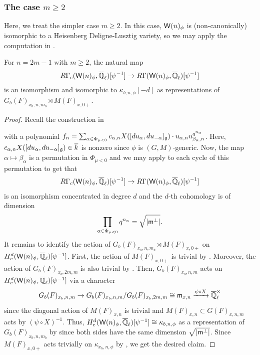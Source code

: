 \documentclass[12pt,reqno]{amsart}
\begin{document}
\subsubsection{The case $m \geq 2$}

Here, we treat the simpler case $m \geq 2$. In this case, ${\mathsf{W}}(n)_\phi$ is (non-canonically) isomorphic to a Heisenberg Deligne-Lusztig variety, so we may apply the computation in \cite{Tak26_Yu}. 

\begin{prop} \label{prop:cohomology_reduction_odd_partial}
    For $n = 2m - 1$ with $m \geq 2$, the natural map 
    \[
        R\Gamma_c({\mathsf{W}}(n)_\phi, {\overline{\mathbb{Q}}_\ell})[\psi^{-1}] \to R\Gamma({\mathsf{W}}(n)_\phi, {\overline{\mathbb{Q}}_\ell})[\psi^{-1}]
    \]
    is an isomorphism and isomorphic to $\kappa_{b, n, \phi}[-d]$ as representations of $G_b(F)_{x_b, n, m_b} \rtimes M(F)_{x, 0+}$. 
\end{prop}
\begin{proof}
    Recall the construction in 
    \begin{center}
    \end{center}
    with a polynomial $f_{n} = \sum_{\alpha \in \Phi_{\mu<0}} c_{\alpha,n}X([du_\alpha, du_{-\alpha}]_{{\mathfrak{g}}}) \cdot u_{\alpha,n} u_{\beta_\alpha,n}^{q^{n_\alpha}}$. Here, $c_{\alpha,n}X([du_\alpha, du_{-\alpha}]_{{\mathfrak{g}}}) \in {\overline{k}}$ is nonzero since $\phi$ is $(G, M)$-generic. Now, the map $\alpha \mapsto \beta_\alpha$ is a permutation in $\Phi_{\mu < 0}$ and we may apply \cite[Theorem 4.1]{Tak26_Yu} to each cycle of this permutation to get that 
    \[
        R\Gamma_c({\mathsf{W}}(n)_\phi, {\overline{\mathbb{Q}}_\ell})[\psi^{-1}] \to R\Gamma({\mathsf{W}}(n)_\phi, {\overline{\mathbb{Q}}_\ell})[\psi^{-1}]
    \]
    is an isomorphism concentrated in degree $d$ and the $d$-th cohomology is of dimension 
    \[
        \prod_{\alpha \in \Phi_{\mu < 0}} q^{n_\alpha} = \sqrt{\lvert {\mathsf{m}}^\perp \rvert}. 
    \]
    It remains to identify the action of $G_b(F)_{x_b, n, m_b} \rtimes M(F)_{x, 0+}$ on $H_c^d({\mathsf{W}}(n)_\phi, {\overline{\mathbb{Q}}_\ell})[\psi^{-1}]$. First, the action of $M(F)_{x, 0+}$ is trivial by . Moreover, the action of $G_b(F)_{x_b, 2m, m}$ is also trivial by . Then, $G_b(F)_{x_b, n, m}$ acts on $H_c^d({\mathsf{W}}(n)_\phi, {\overline{\mathbb{Q}}_\ell})[\psi^{-1}]$ via a character 
    \[
        G_b(F)_{x_b, n, m} \to G_b(F)_{x_b, n, m} / G_b(F)_{x_b, 2m, m} \cong {\mathsf{m}}_{x, n} \xrightarrow{\psi \circ X} {\overline{\mathbb{Q}}_\ell^\times}
    \]
    since the diagonal action of $M(F)_{x, n}$ is trivial and $M(F)_{x, n} \subset G(F)_{x, n, m}$ acts by $(\psi \circ X)^{-1}$. Thus, $H_c^d({\mathsf{W}}(n)_\phi, {\overline{\mathbb{Q}}_\ell})[\psi^{-1}] \cong \kappa_{b, n, \phi}$ as a representation of $G_b(F)_{x_b, n, m_b}$ by  since both sides have the same dimension $\sqrt{\lvert {\mathsf{m}}^\perp \rvert}$. Since $M(F)_{x, 0+}$ acts trivially on $\kappa_{x_b, n, \phi}$ by \cite[Theorem 2.27]{Tak26_Yu}, we get the desired claim. 
\end{proof}
\end{document}
